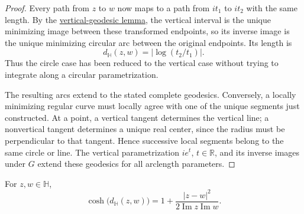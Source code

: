 \begin{proof}
Every path from $z$ to $w$ now maps to a path from $it_1$ to $it_2$ with the same length. By the \hyperref[hyperbolic.vertical-geodesics]{vertical-geodesic lemma}, the vertical interval is the unique minimizing image between these transformed endpoints, so its inverse image is the unique minimizing circular arc between the original endpoints. Its length is
\[
 d_{\mathbb H}(z,w)=|\log(t_2/t_1)|.
\]
Thus the circle case has been reduced to the vertical case without trying to integrate along a circular parametrization.

The resulting arcs extend to the stated complete geodesics. Conversely, a locally minimizing regular curve must locally agree with one of the unique segments just constructed. At a point, a vertical tangent determines the vertical line; a nonvertical tangent determines a unique real center, since the radius must be perpendicular to that tangent. Hence successive local segments belong to the same circle or line. The vertical parametrization $ie^t$, $t\in\mathbb R$, and its inverse images under $G$ extend these geodesics for all arclength parameters.
\end{proof}

\begin{proposition}\label{hyperbolic.distance-formula}
For $z,w\in\mathbb H$,
\begin{equation}\label{eq:hyperbolic-distance}
 \cosh\bigl(d_{\mathbb H}(z,w)\bigr)
 =1+\frac{|z-w|^2}{2\operatorname{Im}z\operatorname{Im}w}.
\end{equation}
\end{proposition}

